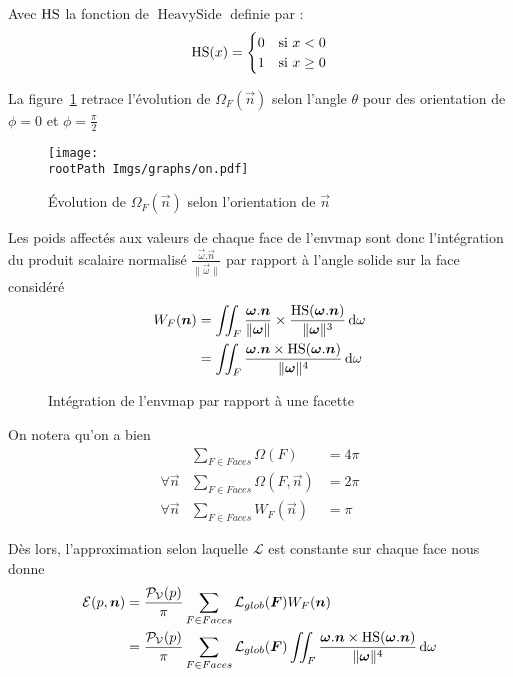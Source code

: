 \documentclass[10pt,a4paper,twoside, twocolumn]{report}
\newcommand*{\rootPath}{../}
\begin{document}
Avec $\operatorname{HS}$ la fonction de $\operatorname{HeavySide}$ definie par :
\begin{align}
	\operatorname{HS}(x) = \begin{cases} 0 &\text{si } x<0 \\ 1 & \text{si } x\geq 0\end{cases} \notag
\end{align}

La figure~\ref{fig:curve:omega_theta} retrace l'évolution de $\Omega_F(\vec n)$ selon l'angle $\theta$ pour des orientation de $\phi=0$ et $\phi=\frac{\pi}{2}$

\begin{figure}[!ht]\centering
	\texttt{[image: \\rootPath Imgs/graphs/on.pdf]}
	\caption{Évolution de $\Omega_F(\vec n)$ selon l'orientation de $\vec n$}
	\label{fig:curve:omega_theta}
\end{figure}

Les poids affectés aux valeurs de chaque face de l'envmap sont donc l'intégration du produit scalaire normalisé $\frac{\vec\omega.\vec n}{\|\vec \omega\|}$ par rapport à l'angle solide sur la face considéré
\begin{align}
	W_F(\vec n)
		&= \iint_{F}\frac{\vec\omega.\vec n}{\|\vec \omega\|}\times\frac{\Hs(\vec\omega.\vec n)}{\|\vec\omega\|^3}\, \mathrm d\omega \notag\\
		&= \iint_{F}\frac{\vec\omega.\vec n\times\Hs(\vec\omega.\vec n)}{\|\vec\omega\|^4}\, \mathrm d\omega
		\label{ref:eq:wintegral}
\end{align}

\begin{figure}[!ht]
	\centering
	
	\caption{Intégration de l'envmap par rapport à une facette}
	\label{fig:tikz:envmapFacet}
\end{figure}

On notera qu'on a bien 
\begin{subequations}
	\begin{align}
					& \sum_{F \in Faces} \Omega(F) 								&=4\pi\\
	\forall \vec n	& \sum_{F \in Faces} \Omega(F,\vec n)	&=2\pi\\	
	\forall \vec n	& \sum_{F \in Faces} W_F(\vec n)			&=\pi	
	\end{align}
\end{subequations}

Dès lors, l'approximation selon laquelle $\mathcal L$ est constante sur chaque face nous donne
\begin{align}
	\mathcal E(p, \vec n)
		& = \frac{\mathcal P_{\mathcal V}(p)}{\pi}\sum_{F \in Faces}\mathcal L_{glob}(\vec F)W_F(\vec n) \notag \\
		& = \frac{\mathcal P_{\mathcal V}(p)}{\pi}\sum_{F \in Faces}\mathcal L_{glob}(\vec F)\iint_{F}\frac{\vec\omega.\vec n\times\Hs(\vec\omega.\vec n)}{\|\vec\omega\|^4}\, \mathrm d\omega
		\label{ref:eq:sumintegral_model}
\end{align}
\end{document}

